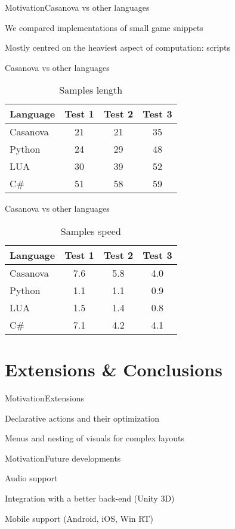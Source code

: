 \documentclass{beamer}
\begin{document}
\begin{slide}{Motivation}{Casanova vs other languages}{
\item We compared implementations of small game snippets
\item Mostly centred on the heaviest aspect of computation: scripts
}\end{slide}


\begin{frame}[fragile]{Casanova vs other languages}
\begin{table}
\center
\begin{tabular}{| l | c | c | c |}
\hline
Language & Test 1 & Test 2 & Test 3 \\
\hline
Casanova & 21 & 21 & 35 \\
Python & 24 & 29 & 48 \\
LUA & 30 & 39 & 52 \\
C\# & 51 & 58 & 59 \\
\hline
\end{tabular}
\caption{Samples length}
\end{table}
\end{frame}

\begin{frame}{Casanova vs other languages}
\begin{table}
\center
\begin{tabular}{| l | c | c | c |}
\hline
Language & Test 1 & Test 2 & Test 3 \\
\hline
Casanova & 7.6 & 5.8 & 4.0 \\
Python & 1.1 & 1.1 & 0.9 \\
LUA & 1.5 & 1.4 & 0.8 \\
C\# & 7.1 & 4.2 & 4.1 \\
\hline
\end{tabular}
\caption{Samples speed}
\end{table}
\end{frame}

\section{Extensions \& Conclusions}
\begin{slide}{Motivation}{Extensions}{
\item Declarative actions and their optimization
\item Menus and nesting of visuals for complex layouts
}\end{slide}


\begin{slide}{Motivation}{Future developments}{
\item Audio support
\item Integration with a better back-end (Unity 3D)
\item Mobile support (Android, iOS, Win RT)
}\end{slide}
\end{document}
